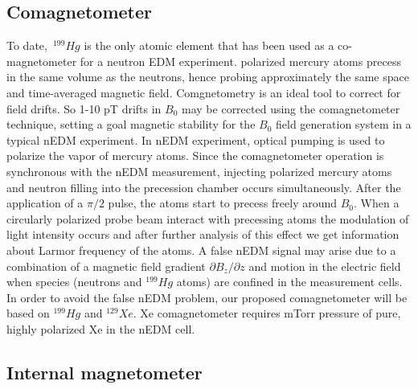 \subsection{Comagnetometer}
To date,~$^{199}Hg$ is the only atomic element that has been used as a co-magnetometer for a neutron EDM experiment\cite{PhysRevLett.97.131801}\cite{PhysRevLett.102.101601}.  polarized mercury atoms precess in the same volume as the neutrons, hence probing approximately the same space and time-averaged magnetic field.  Comgnetometry is an ideal tool to correct for field drifts.  So 1-10 pT drifts in $B_0$  may be corrected using the comagnetometer technique, setting a goal magnetic stability for the $B_0$  field generation system in a typical nEDM experiment\cite{PhysRevLett.97.131801}\cite{afach:in2p3-01062292}. In nEDM experiment, optical pumping is used to polarize the vapor of mercury atoms. Since the comagnetometer operation is synchronous with the nEDM measurement, injecting polarized mercury atoms and  neutron filling into the precession chamber occurs simultaneously. After the application of a $\pi/2$ pulse, the atoms start to precess freely around $B_0$. When a circularly polarized probe beam interact with precessing atoms the modulation of light intensity occurs and after further analysis of  this effect we get information about Larmor frequency of the atoms. A false nEDM signal may arise due to a combination of a magnetic field gradient $\partial B_{z}/{\partial  z}$ and motion in the electric field when species (neutrons and $^{199}Hg$ atoms) are confined in the measurement cells. In order to avoid the false nEDM problem, our proposed comagnetometer will be based on $^{199}Hg$ and $^{129}Xe$. Xe comagnetometer requires mTorr pressure of pure,
highly polarized Xe in the nEDM cell.

\subsection{Internal magnetometer}


